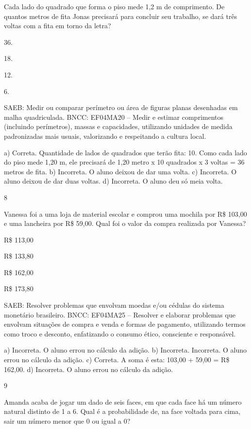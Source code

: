 \begin{mdframed}[linewidth=2pt,linecolor=salmao,roundcorner=2pt]
\begin{escolha}
{\begin{escolha}
Cada lado do quadrado que forma o piso mede 1,2 m de
comprimento. De quantos metros de fita Jonas precisará para concluir seu
trabalho, se dará três voltas com a fita em torno da letra?

\begin{escolha}
\item
  36.
\item
  18.
\item
  12.
\item
  6.
\end{escolha}

SAEB: Medir ou comparar perímetro ou área de figuras planas
desenhadas em malha quadriculada.
BNCC: EF04MA20 -- Medir e estimar comprimentos (incluindo perímetros), massas e capacidades, utilizando
unidades de medida padronizadas mais usuais, valorizando e respeitando a cultura local.

a) Correta. Quantidade de lados de quadrados que terão fita: 10. Como cada lado do piso mede 1,20 m, ele precisará de 1,20 metro x 10 quadrados x 3 voltas = 36 metros de fita.
b) Incorreta. O aluno deixou de dar uma volta.
c) Incorreta. O aluno deixou de dar duas voltas.
d) Incorreta. O aluno deu só meia volta.

\num{8}

Vanessa foi a uma loja de material escolar e comprou uma mochila por R\$ 103,00 e uma lancheira por R\$ 59,00. Qual foi o valor da compra realizada por Vanessa?

\begin{escolha}
\item
  R\$ 113,00
\item
  R\$ 133,80
\item
  R\$ 162,00
\item
  R\$ 173,80
\end{escolha}

SAEB: Resolver problemas que envolvam moedas e/ou cédulas do
sistema monetário brasileiro.
BNCC: EF04MA25 -- Resolver e elaborar problemas que envolvam situações de compra e venda e formas
de pagamento, utilizando termos como troco e desconto, enfatizando o consumo ético, consciente e
responsável.

a) Incorreta. O aluno errou no cálculo da adição.
b) Incorreta. Incorreta. O aluno errou no cálculo da adição.
c) Correta. A soma é esta: 103,00 + 59,00 = R\$ 162,00.
d) Incorreta. O aluno errou no cálculo da adição.

\num{9}

Amanda acaba de jogar um dado de seis faces, em que cada face
há um número natural distinto de 1 a 6. Qual é a probabilidade de, na
face voltada para cima, sair um número menor que 0 ou igual a 0?


\end{escolha}}
\end{escolha}
\end{mdframed}
